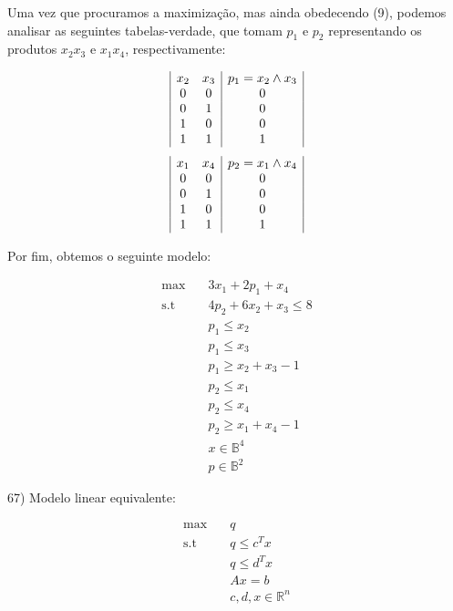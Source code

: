 \documentclass[]{article}
\begin{document}
Uma vez que procuramos a maximização, mas ainda obedecendo (9), podemos analisar as seguintes tabelas-verdade, que tomam $p_1$ e $p_2$ representando os produtos $x_2 x_3$ e $x_1 x_4$, respectivamente:

\begin{displaymath}
\begin{array}{|c c|c|}
x_2 & x_3 & p_1 = x_2 \land x_3\\
  0 &   0 & 0\\
  0 &   1 & 0\\
  1 &   0 & 0\\
  1 &   1 & 1
\end{array}
\end{displaymath}
\begin{displaymath}
\begin{array}{|c c|c|}
x_1 & x_4 & p_2 = x_1 \land x_4\\
  0 &   0 & 0\\
  0 &   1 & 0\\
  1 &   0 & 0\\
  1 &   1 & 1
\end{array}
\end{displaymath}

Por fim, obtemos o seguinte modelo:

\begin{align}
\max        &\quad 3 x_1 + 2 p_1 + x_4 \\
\text{s.t}  &\quad 4 p_2 + 6 x_2 + x_3 \leq 8 \\
            &\quad p_1 \leq x_2 \\
            &\quad p_1 \leq x_3 \\
            &\quad p_1 \geq x_2 + x_3 - 1 \\
            &\quad p_2 \leq x_1 \\
            &\quad p_2 \leq x_4 \\
            &\quad p_2 \geq x_1 + x_4 - 1 \\
            &\quad x \in \mathbb{B}^4 \\
            &\quad p \in \mathbb{B}^2
\end{align}

\vspace{0.5cm}

67) Modelo linear equivalente:

\begin{align}
\max        &\quad q \\
\text{s.t}  &\quad q \leq c^T x \\
            &\quad q \leq d^T x \\
            &\quad Ax = b \\\
            &\quad c, d, x \in \mathbb{R}^n
\end{align}
\end{document}
